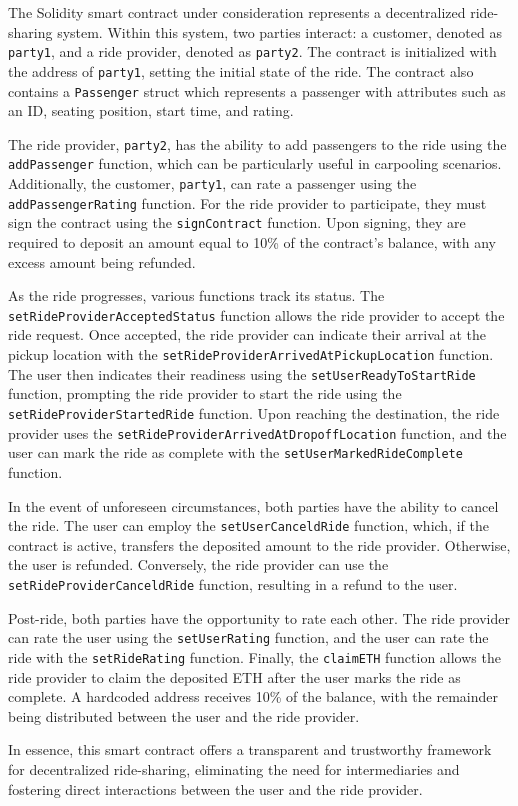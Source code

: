 The Solidity smart contract under consideration represents a decentralized ride-sharing system. Within this system, two parties interact: a customer, denoted as \texttt{party1}, and a ride provider, denoted as \texttt{party2}. The contract is initialized with the address of \texttt{party1}, setting the initial state of the ride. The contract also contains a \texttt{Passenger} struct which represents a passenger with attributes such as an ID, seating position, start time, and rating. 

The ride provider, \texttt{party2}, has the ability to add passengers to the ride using the \texttt{addPassenger} function, which can be particularly useful in carpooling scenarios. Additionally, the customer, \texttt{party1}, can rate a passenger using the \texttt{addPassengerRating} function. For the ride provider to participate, they must sign the contract using the \texttt{signContract} function. Upon signing, they are required to deposit an amount equal to 10\% of the contract's balance, with any excess amount being refunded.

As the ride progresses, various functions track its status. The \texttt{setRideProviderAcceptedStatus} function allows the ride provider to accept the ride request. Once accepted, the ride provider can indicate their arrival at the pickup location with the \texttt{setRideProviderArrivedAtPickupLocation} function. The user then indicates their readiness using the \texttt{setUserReadyToStartRide} function, prompting the ride provider to start the ride using the \texttt{setRideProviderStartedRide} function. Upon reaching the destination, the ride provider uses the \texttt{setRideProviderArrivedAtDropoffLocation} function, and the user can mark the ride as complete with the \texttt{setUserMarkedRideComplete} function.

In the event of unforeseen circumstances, both parties have the ability to cancel the ride. The user can employ the \texttt{setUserCanceldRide} function, which, if the contract is active, transfers the deposited amount to the ride provider. Otherwise, the user is refunded. Conversely, the ride provider can use the \texttt{setRideProviderCanceldRide} function, resulting in a refund to the user.

Post-ride, both parties have the opportunity to rate each other. The ride provider can rate the user using the \texttt{setUserRating} function, and the user can rate the ride with the \texttt{setRideRating} function. Finally, the \texttt{claimETH} function allows the ride provider to claim the deposited ETH after the user marks the ride as complete. A hardcoded address receives 10\% of the balance, with the remainder being distributed between the user and the ride provider.

In essence, this smart contract offers a transparent and trustworthy framework for decentralized ride-sharing, eliminating the need for intermediaries and fostering direct interactions between the user and the ride provider.
